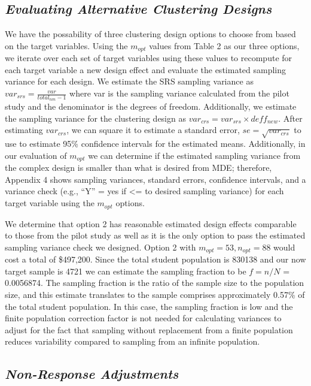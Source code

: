 \documentclass[
  12pt]{article}
\begin{document}
\subsection{\texorpdfstring{\emph{Evaluating Alternative Clustering
Designs}}{Evaluating Alternative Clustering Designs}}\label{evaluating-alternative-clustering-designs}

We have the possability of three clustering design options to choose
from based on the target variables. Using the \(m_{opt}\) values from
Table 2 as our three options, we iterate over each set of target
variables using these values to recompute for each target variable a new
design effect and evaluate the estimated sampling variance for each
design. We estimate the SRS sampling variance as
\(var_{srs} = \frac{var}{total_{nm} - 1}\) where var is the sampling
variance calculated from the pilot study and the denominator is the
degrees of freedom. Additionally, we estimate the sampling variance for
the clustering design as \(var_{crs} = var_{srs} \times deff_{new}\).
After estimating \(var_{crs}\), we can square it to estimate a standard
error, \(se=\sqrt{var_{crs}}\) to use to estimate 95\% confidence
intervals for the estimated means. Additionally, in our evaluation of
\(m_{opt}\) we can determine if the estimated sampling variance from the
complex design is smaller than what is desired from MDE; therefore,
Appendix 4 shows sampling variances, standard errors, confidence
intervals, and a variance check (e.g., ``Y'' = yes if \textless= to
desired sampling variance) for each target variable using the
\(m_{opt}\) options.

We determine that option 2 has reasonable estimated design effects
comparable to those from the pilot study as well as it is the only
option to pass the estimated sampling variance check we designed. Option
2 with \(m_{opt} = 53, n_{opt} = 88\) would cost a total of \$497,200.
Since the total student population is 830138 and our now target sample
is 4721 we can estimate the sampling fraction to be \(f = n/N\) =
0.0056874. The sampling fraction is the ratio of the sample size to the
population size, and this estimate translates to the sample comprises
approximately 0.57\% of the total student population. In this case, the
sampling fraction is low and the finite population correction factor is
not needed for calculating variances to adjust for the fact that
sampling without replacement from a finite population reduces
variability compared to sampling from an infinite population.

\subsection{\texorpdfstring{\emph{Non-Response
Adjustments}}{Non-Response Adjustments}}\label{non-response-adjustments}
\end{document}
